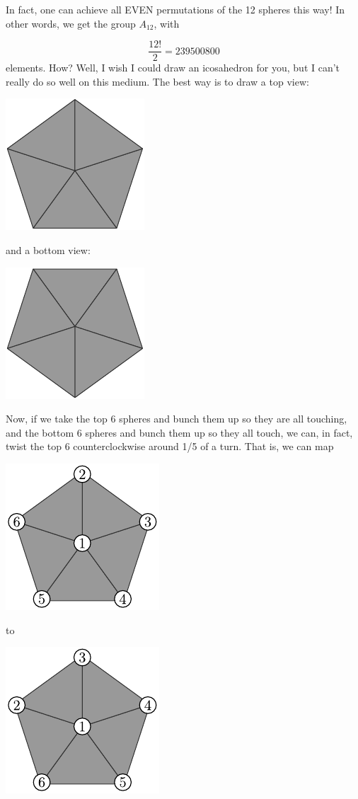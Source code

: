 In fact, one can achieve all EVEN permutations of the 12 spheres this way! In other words, we get the group $A_{12}$, with

\[ \frac{12!}{2} = 239500800\]
elements. How? Well, I wish I could draw an icosahedron for you, but I can't really do so well on this medium. The best way is to draw a top view:
\begin{center}
\includegraphics[]{figures/wk20_fig6.pdf}
\end{center}
and a bottom view:
\begin{center}
\includegraphics[]{figures/wk20_fig7.pdf}
\end{center}
Now, if we take the top 6 spheres and bunch them up so they are all touching, and the bottom 6 spheres and bunch them up so they all touch, we can, in fact, twist the top 6 counterclockwise around 1/5 of a turn. That is, we can map
\begin{center}
\includegraphics[]{figures/wk20_fig8.pdf}
\end{center}
to
\begin{center}
\includegraphics[]{figures/wk20_fig9.pdf}
\end{center}

